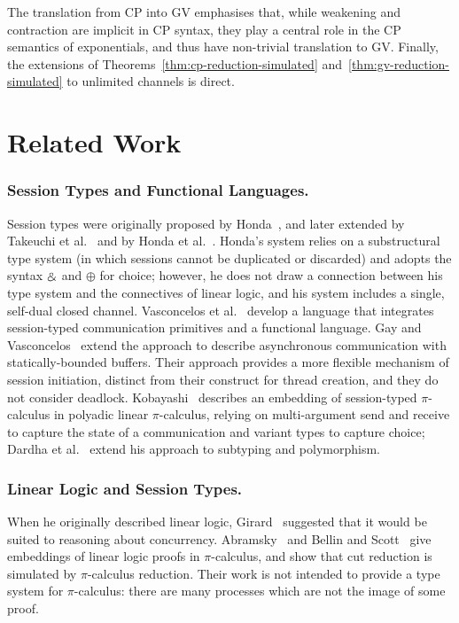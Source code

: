 \documentclass[oribibl,orivec,envcountsame]{llncs}
\begin{document}
The translation from CP into GV emphasises that, while weakening and contraction are implicit in CP
syntax, they play a central role in the CP semantics of exponentials, and thus have non-trivial
translation to GV.  Finally, the extensions of Theorems~\ref{thm:cp-reduction-simulated}
and~\ref{thm:gv-reduction-simulated} to unlimited channels is direct.


\section{Related Work}\label{sec:related}


\subsubsection{Session Types and Functional Languages.}

Session types were originally proposed by Honda~\cite{Honda93}, and later extended by Takeuchi et
al.~\cite{Takeuchi94} and by Honda et al.~\cite{Honda98}.  Honda's system relies on a substructural
type system (in which sessions cannot be duplicated or discarded) and adopts the syntax $\mathbin\binampersand$ and
$\oplus$ for choice; however, he does not draw a connection between his type system and the
connectives of linear logic, and his system includes a single, self-dual closed channel.
Vasconcelos et al.~\cite{VasconcelosGR06} develop a language that integrates session-typed
communication primitives and a functional language.  Gay and Vasconcelos~\cite{GayVasconcelos10}
extend the approach to describe asynchronous communication with statically-bounded buffers.  Their
approach provides a more flexible mechanism of session initiation, distinct from their construct for
thread creation, and they do not consider deadlock.  Kobayashi~\cite{Kobayashi02} describes an
embedding of session-typed $\pi$-calculus in polyadic linear $\pi$-calculus, relying on
multi-argument send and receive to capture the state of a communication and variant types to capture
choice; Dardha et al.~\cite{Dardha12} extend his approach to subtyping and polymorphism.

\subsubsection{Linear Logic and Session Types.}

When he originally described linear logic, Girard~\cite{Girard87} suggested that it would be suited
to reasoning about concurrency.  Abramsky~\cite{Abramsky92} and Bellin and
Scott~\cite{BellinScott94} give embeddings of linear logic proofs in $\pi$-calculus, and show that
cut reduction is simulated by $\pi$-calculus reduction.  Their work is not intended to provide a
type system for $\pi$-calculus: there are many processes which are not the image of some proof.
\end{document}
